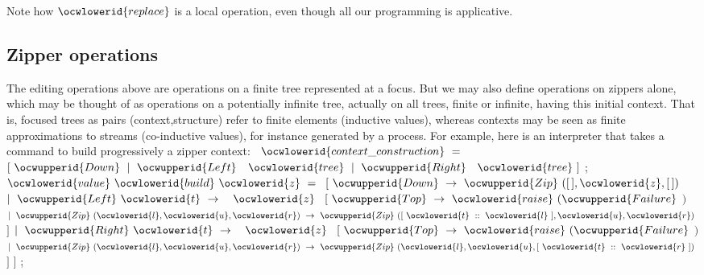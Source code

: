 \documentclass[12pt]{article}
\begin{document}
\ocwendcode{}\ocwindent{0.00em}
Note how \ocwbegindcode{}$\ocwlowerid{replace}$\ocwenddcode{} is a local operation, even though all our programming is applicative. 

\subsection{Zipper operations}

The editing operations above are operations on a finite tree represented
at a focus. But we may also define operations on zippers alone, which may
be thought of as operations on a potentially infinite tree, actually on
all trees, finite or infinite, having this initial context. That is, focused
trees as pairs (context,structure) refer to finite elements (inductive values),
whereas contexts may be seen as finite approximations to streams
(co-inductive values), for instance generated by a process. 
For example, here is an interpreter that takes a command to build 
progressively a zipper context: 
\ocweol
\label{../ML/zipper.ml:4697}%
\medskip
\ocwbegincode{}\ocwindent{0.00em}
~$\ocwlowerid{context\_construction}~=$\ocweol
\ocwindent{1.00em}
$[~\ocwupperid{Down}~\mid{}~\ocwupperid{Left}~$~$\ocwlowerid{tree}~\mid{}~\ocwupperid{Right}~$~$\ocwlowerid{tree}~]$\ocweol
\ocwindent{0.00em}
;\ocweol
\ocwindent{0.00em}
$\ocwlowerid{value}~\ocwlowerid{build}~\ocwlowerid{z}~=~$\ocweol
\ocwindent{1.00em}
$[~\ocwupperid{Down}~\rightarrow{}~\ocwupperid{Zip}~([\,],\ocwlowerid{z},[\,])$\ocweol
\ocwindent{1.00em}
$\mid{}~\ocwupperid{Left}~\ocwlowerid{t}~\rightarrow{}~$~$\ocwlowerid{z}~$\ocweol
\ocwindent{2.50em}
$[~\ocwupperid{Top}~\rightarrow{}~\ocwlowerid{raise}~(\ocwupperid{Failure}~$$)$\ocweol
\ocwindent{2.50em}
$\mid{}~\ocwupperid{Zip}~(\ocwlowerid{l},\ocwlowerid{u},\ocwlowerid{r})~\rightarrow{}~\ocwupperid{Zip}~([~\ocwlowerid{t}~::~\ocwlowerid{l}~],\ocwlowerid{u},\ocwlowerid{r})~$\ocweol
\ocwindent{2.50em}
$]$\ocweol
\ocwindent{1.00em}
$\mid{}~\ocwupperid{Right}~\ocwlowerid{t}~\rightarrow{}~$~$\ocwlowerid{z}~$\ocweol
\ocwindent{2.50em}
$[~\ocwupperid{Top}~\rightarrow{}~\ocwlowerid{raise}~(\ocwupperid{Failure}~$$)$\ocweol
\ocwindent{2.50em}
$\mid{}~\ocwupperid{Zip}~(\ocwlowerid{l},\ocwlowerid{u},\ocwlowerid{r})~\rightarrow{}~\ocwupperid{Zip}~(\ocwlowerid{l},\ocwlowerid{u},[~\ocwlowerid{t}~::~\ocwlowerid{r}~])~$\ocweol
\ocwindent{2.50em}
$]$\ocweol
\ocwindent{1.00em}
$]$\ocweol
\ocwindent{0.00em}
;\medskip
\end{document}
